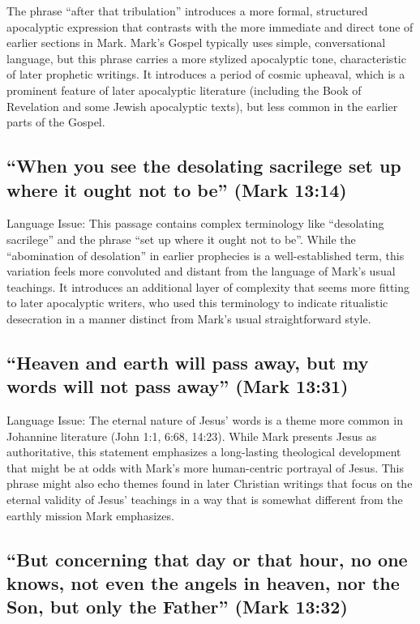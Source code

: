 The phrase ``after that tribulation'' introduces a more formal, structured apocalyptic expression that contrasts with the more immediate and direct tone of earlier sections in Mark.
Mark's Gospel typically uses simple, conversational language, but this phrase carries a more stylized apocalyptic tone, characteristic of later prophetic writings.
It introduces a period of cosmic upheaval, which is a prominent feature of later apocalyptic literature (including the Book of Revelation and some Jewish apocalyptic texts), but less common in the earlier parts of the Gospel.

\subsection{``When you see the desolating sacrilege set up where it ought not to be'' (Mark 13:14)}\label{subsec:when-you-see-the-desolating-sacrilege-set-up-where-it-ought-not-to-be-mark-1314}

Language Issue: This passage contains complex terminology like ``desolating sacrilege'' and the phrase ``set up where it ought not to be''.
While the ``abomination of desolation'' in earlier prophecies is a well-established term, this variation feels more convoluted and distant from the language of Mark's usual teachings.
It introduces an additional layer of complexity that seems more fitting to later apocalyptic writers, who used this terminology to indicate ritualistic desecration in a manner distinct from Mark's usual straightforward style.

\subsection{``Heaven and earth will pass away, but my words will not pass away'' (Mark 13:31)}\label{subsec:heaven-and-earth-will-pass-away-but-my-words-will-not-pass-away-mark-1331}

Language Issue: The eternal nature of Jesus' words is a theme more common in Johannine literature (John 1:1, 6:68, 14:23).
While Mark presents Jesus as authoritative, this statement emphasizes a long-lasting theological development that might be at odds with Mark's more human-centric portrayal of Jesus.
This phrase might also echo themes found in later Christian writings that focus on the eternal validity of Jesus' teachings in a way that is somewhat different from the earthly mission Mark emphasizes.

\subsection{``But concerning that day or that hour, no one knows, not even the angels in heaven, nor the Son, but only the Father'' (Mark 13:32)}\label{subsec:but-concerning-that-day-or-that-hour-no-one-knows-not-even-the-angels-in-heaven-nor-the-son-but-only-the-father-mark-1332}


